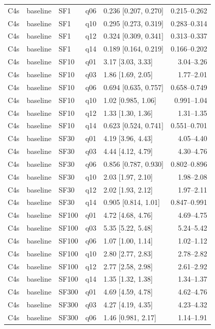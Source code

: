 \begin{longtable}{lllllr}
C4s & baseline & SF1 & q06 & 0.236 [0.207, 0.270] & 0.215--0.262 \\
C4s & baseline & SF1 & q10 & 0.295 [0.273, 0.319] & 0.283--0.314 \\
C4s & baseline & SF1 & q12 & 0.324 [0.309, 0.341] & 0.313--0.337 \\
C4s & baseline & SF1 & q14 & 0.189 [0.164, 0.219] & 0.166--0.202 \\
C4s & baseline & SF10 & q01 & 3.17 [3.03, 3.33] & 3.04--3.26 \\
C4s & baseline & SF10 & q03 & 1.86 [1.69, 2.05] & 1.77--2.01 \\
C4s & baseline & SF10 & q06 & 0.694 [0.635, 0.757] & 0.658--0.749 \\
C4s & baseline & SF10 & q10 & 1.02 [0.985, 1.06] & 0.991--1.04 \\
C4s & baseline & SF10 & q12 & 1.33 [1.30, 1.36] & 1.31--1.35 \\
C4s & baseline & SF10 & q14 & 0.623 [0.524, 0.741] & 0.551--0.701 \\
C4s & baseline & SF30 & q01 & 4.19 [3.96, 4.43] & 4.05--4.40 \\
C4s & baseline & SF30 & q03 & 4.44 [4.12, 4.79] & 4.30--4.76 \\
C4s & baseline & SF30 & q06 & 0.856 [0.787, 0.930] & 0.802--0.896 \\
C4s & baseline & SF30 & q10 & 2.03 [1.97, 2.10] & 1.98--2.08 \\
C4s & baseline & SF30 & q12 & 2.02 [1.93, 2.12] & 1.97--2.11 \\
C4s & baseline & SF30 & q14 & 0.905 [0.814, 1.01] & 0.847--0.991 \\
C4s & baseline & SF100 & q01 & 4.72 [4.68, 4.76] & 4.69--4.75 \\
C4s & baseline & SF100 & q03 & 5.35 [5.22, 5.48] & 5.24--5.42 \\
C4s & baseline & SF100 & q06 & 1.07 [1.00, 1.14] & 1.02--1.12 \\
C4s & baseline & SF100 & q10 & 2.80 [2.77, 2.83] & 2.78--2.82 \\
C4s & baseline & SF100 & q12 & 2.77 [2.58, 2.98] & 2.61--2.92 \\
C4s & baseline & SF100 & q14 & 1.35 [1.32, 1.38] & 1.34--1.37 \\
C4s & baseline & SF300 & q01 & 4.69 [4.59, 4.78] & 4.62--4.76 \\
C4s & baseline & SF300 & q03 & 4.27 [4.19, 4.35] & 4.23--4.32 \\
C4s & baseline & SF300 & q06 & 1.46 [0.981, 2.17] & 1.14--1.91 \\

\end{longtable}
